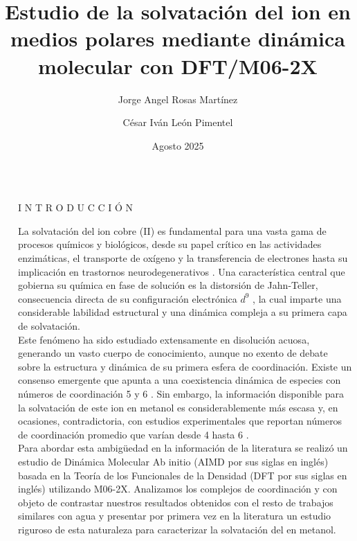 \documentclass[final]{beamer}
\title{Estudio de la solvatación del ion \ce{Cu^{2+}} en medios polares mediante dinámica molecular con DFT/M06-2X}
\author{Jorge Angel Rosas Martínez \inst{1} \and César Iván León Pimentel \inst{2}}
\institute[shortinst]{\inst{1} Facultad de Química, UNAM }
\date{Agosto 2025}
\newlength{\sepwidth}
\newlength{\colwidth}
\newcommand{\separatorcolumn}{\begin{column}{\sepwidth}\end{column}}
\begin{document}
	
\begin{frame}[t]
	
	\begin{columns}[t]
		\separatorcolumn

		\begin{column}{\colwidth}
			\begin{block}{I N T R O D U C C I Ó N}

				\justifying

				La solvatación del ion cobre (II)  es fundamental para una vasta gama de procesos químicos y biológicos, desde su papel crítico en las actividades enzimáticas, el transporte de oxígeno y la transferencia de electrones \cite{Wa-2023-01, Wa-2024-03} hasta su implicación en trastornos neurodegenerativos \cite{Cu-2014-02}. Una característica central que gobierna su química en fase de solución es la distorsión de Jahn-Teller, consecuencia directa de su configuración electrónica $d^9$ \cite{Cu-2019-01}, la cual imparte una considerable labilidad estructural y una dinámica compleja a su primera capa de solvatación.\\ Este fenómeno ha sido estudiado extensamente en disolución acuosa, generando un vasto cuerpo de conocimiento, aunque no exento de debate sobre la estructura y dinámica de su primera esfera de coordinación. Existe un consenso emergente que apunta a una coexistencia dinámica de especies con números de coordinación 5 y 6 \cite{Wa-2023-01}. Sin embargo, la información disponible para la solvatación de este ion en metanol es considerablemente más escasa y, en ocasiones, contradictoria, con estudios experimentales que reportan números de coordinación promedio que varían desde 4 hasta 6 \cite{Me-2025-01}. \\ Para abordar esta ambigüedad en la información de la literatura se realizó un estudio de Dinámica Molecular Ab initio (AIMD por sus siglas en inglés) basada en la Teoría de los Funcionales de la Densidad (DFT por sus siglas en inglés) utilizando M06-2X. Analizamos los complejos de coordinación  y  con objeto de contrastar nuestros resultados obtenidos con el resto de trabajos similares con agua y presentar por primera vez en la literatura un estudio riguroso de esta naturaleza para caracterizar la solvatación del  en metanol.


			\end{block}

		\end{column}


\end{columns}
\end{frame}
\end{document}
